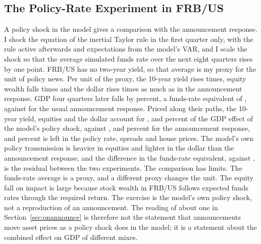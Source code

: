\documentclass[11pt]{article}
\begin{document}
\begin{appendices}
\subsection{The Policy-Rate Experiment in FRB/US}\label{app:policyrate}
A policy shock in the model gives a comparison with the announcement response. I shock the equation of the inertial Taylor rule in the first quarter only, with the rule active afterwards and expectations from the model's VAR, and I scale the shock so that the average simulated funds rate over the next eight quarters rises by one point. FRB/US has no two-year yield, so that average is my proxy for the unit of policy news. Per unit of the proxy, the 10-year yield rises  times, equity wealth falls  times and the dollar rises  times as much as in the announcement response. GDP four quarters later falls by  percent, a funds-rate equivalent of , against  for the usual announcement response. Priced along their paths, the 10-year yield, equities and the dollar account for ,  and  percent of the GDP effect of the model's policy shock, against ,  and  percent for the announcement response, and  percent is left in the policy rate, spreads and house prices. The model's own policy transmission is heavier in equities and lighter in the dollar than the announcement response, and the difference in the funds-rate equivalent,  against , is the residual between the two experiments. The comparison has limits. The funds-rate average is a proxy, and a different proxy changes the unit. The equity fall on impact is large because stock wealth in FRB/US follows expected funds rates through the required return. The exercise is the model's own policy shock, not a reproduction of an announcement. The reading of about one in Section~\ref{sec:onannounce} is therefore not the statement that announcements move asset prices as a policy shock does in the model; it is a statement about the combined effect on GDP of different mixes.

\end{appendices}
\end{document}
